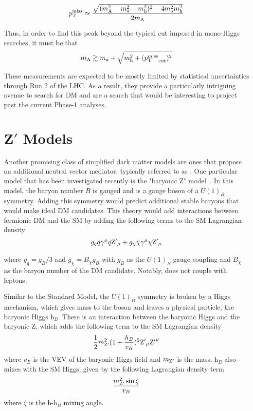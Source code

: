 \begin{equation}
    p_\mathrm{T}^\text{miss} \simeq \frac{\sqrt{(m_\mathrm{A}^2-m_\mathrm{a}^2-m_\mathrm{h}^2)^2-4m_\mathrm{a}^2m_\mathrm{h}^2}}{2m_\mathrm{A}}
    \label{eq:ptmiss}
\end{equation}

Thus, in order to find this peak beyond the typical \ptmiss cut imposed in mono-Higgs searches, it must be that
\begin{equation}
    m_\mathrm{A} \gtrsim m_\mathrm{a} + \sqrt{m_\mathrm{h}^2+({p_\mathrm{T}^\text{miss}}_{\text{cut}})^2}
\end{equation}

These measurements are expected to be mostly limited by statistical uncertainties through Run 2 of the LHC. As a result, they provide a particularly intriguing avenue to search for DM and are a search that would be interesting to project past the current Phase-1 analyses.

\section{Z\texorpdfstring{$'$}{'} Models}
\label{section:Z'}
Another promising class of simplified dark matter models are ones that propose an additional neutral vector mediator, typically referred to as \Zp. One particular \Zp model that has been investigated recently is the "baryonic Z" model~\cite{barZ2014}. In this model, the baryon number $B$ is gauged and \Zp is a gauge boson of a $U(1)_B$ symmetry. Adding this symmetry would predict additional stable baryons that would make ideal DM candidates. This theory would add interactions between fermionic DM and the SM by adding the following terms to the SM Lagrangian density
\begin{equation}
    g_q\bar{q}\gamma^\mu q{\mathrm{Z}'}_\mu + g_\chi\bar{\chi}\gamma^\mu\chi{\mathrm{Z}'}_\mu
\end{equation}

where $g_q = g_B/3$ and $g_\chi = B_\chi g_B$ with $g_B$ as the $U(1)_B$ gauge coupling and $B_\chi$ as the baryon number of the DM candidate. Notably, \Zp does not couple with leptons.

Similar to the Standard Model, the $U(1)_B$ symmetry is broken by a Higgs mechanism, which gives mass to the \Zp boson and leaves a physical particle, the baryonic Higgs h$_B$. There is an interaction between the baryonic Higgs and the baryonic Z, which adds the following term to the SM Lagrangian density
\begin{equation}
    \frac{1}{2}m_{\mathrm{Z}'}^2(1+\frac{h_B}{v_B})^2{\mathrm{Z}'}_\mu{\mathrm{Z}'}^\mu
\end{equation}
where $v_B$ is the VEV of the baryonic Higgs field and $m_{\mathrm{Z}'}$ is the \Zp mass. h$_B$ also mixes with the SM Higgs, given by the following Lagrangian density term
\begin{equation}
    \frac{m_{\mathrm{Z}'}^2\sin\zeta}{v_B}
\end{equation}
where $\zeta$ is the h-h$_B$ mixing angle. 


